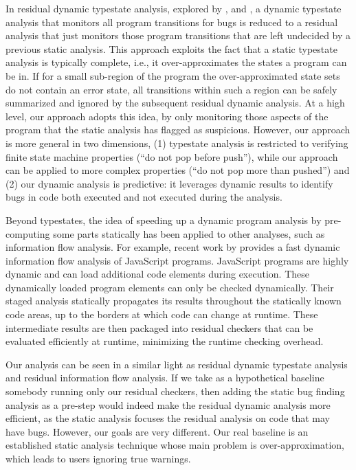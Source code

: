 In residual dynamic typestate analysis, explored by
\cite{dwyer07residual}, \cite{bodden10efficient} and
\cite{bodden07staged}, a dynamic typestate analysis that monitors all
program transitions for bugs is reduced to a residual analysis that
just monitors those program transitions that are left undecided by a
previous static analysis. This approach exploits the fact that a
static typestate analysis is typically complete, i.e., it
over-approximates the states a program can be in. If for a small
sub-region of the program the over-approximated state sets do not
contain an error state, all transitions within such a region can
be safely summarized and ignored by the subsequent residual
dynamic analysis. At a high level, our approach adopts this idea, by
only monitoring those aspects of the program that the static analysis
has flagged as suspicious. However, our approach is more general in
two dimensions, (1) typestate analysis is restricted to verifying
finite state machine properties (``do not pop before push''), while
our approach can be applied to more complex properties (``do not pop
more than pushed'') and (2) our dynamic analysis is predictive: it
leverages dynamic results to identify bugs in code both executed and
not executed during the analysis.

Beyond typestates, the idea of speeding up a dynamic program analysis
by pre-computing some parts statically has been applied to other
analyses, such as information flow analysis. For example, recent work
by \cite{chugh09staged} provides a fast dynamic
information flow analysis of JavaScript programs. JavaScript programs
are highly dynamic and can load additional code elements during
execution. These dynamically loaded program elements can only be
checked dynamically. Their staged analysis statically propagates its
results throughout the statically known code areas, up to the borders
at which code can change at runtime. These intermediate results are
then packaged into residual checkers that can be evaluated efficiently
at runtime, minimizing the runtime checking overhead.

Our analysis can be seen in a similar light as residual dynamic typestate analysis and residual information flow analysis. If we take as a hypothetical baseline somebody running only our residual checkers, then adding the static bug finding analysis as a pre-step would indeed make the residual dynamic analysis more efficient, as the static analysis focuses the residual analysis on code that may have bugs. However, our goals are very different. Our 
real baseline is an established static analysis technique whose main problem is over-approximation, which leads to users ignoring true warnings. 

